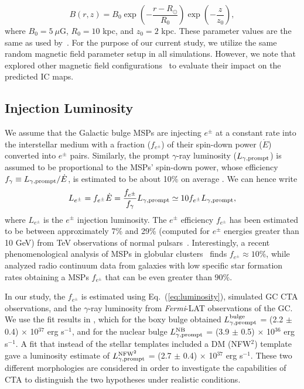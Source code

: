 \documentclass[doublespace,nopageskip]{VTthesis} %
\begin{document}
\begin{equation}\label{eq:Bfield}
	B(r,z) = B_0 \exp{\left(-\dfrac{r-R_\odot}{R_0}\right)}\exp{\left(-\dfrac{z}{z_0}\right)},
\end{equation}
where $B_0 = 5\ \mu$G, $R_0 = 10$ kpc, and $z_0 = 2$ kpc. These parameter values are the same as used by~\citet{Johannesson:2018bit}. For the purpose of our current study, we utilize the same random magnetic field parameter setup in all simulations. However, 
we note that \cite{Song:2019nrx} explored other magnetic field configurations~\citep{Crocker:2010xc} to evaluate their impact on the predicted IC maps. 



\subsection{Injection Luminosity}

We assume that the Galactic bulge MSPs are injecting $e^{\pm}$ at a constant rate into the interstellar medium with a fraction ($f_{e^{\pm}}$) of their spin-down power ($\dot E$) converted into $e^{\pm}$ pairs. Similarly, the prompt $\gamma$-ray luminosity ($L_{\gamma,{\rm prompt}}$) is assumed to be proportional to the MSPs' spin-down power, whose efficiency $f_\gamma \equiv L_{\gamma,{\rm prompt}}/\dot{E}$, is estimated to be about 10\% on average \citep{TheFermi-LAT:2013ssa}. We can hence write 
\begin{equation}\label{eq:luminosity}
  L_{e^\pm}=f_{e^\pm}\dot{E}=\frac{f_{e^\pm}}{f_{\gamma}}  L_{\gamma,{\rm prompt}} \simeq 10f_{e^\pm} L_{\gamma,{\rm prompt}},
\end{equation}
where $L_{e^\pm}$ is the $e^\pm$ injection luminosity. The $e^\pm$ efficiency $f_{e^\pm}$ has been estimated to be between approximately 7\% and 29\% (computed for $e^\pm$ energies greater than 10 GeV) from TeV observations of normal pulsars~\citep{Hooper:2017gtd}.
Interestingly, a recent phenomenological analysis of MSPs in globular clusters~\citep{Song:2021zrs} finds $f_{e^\pm}\approx 10\%$, while \citet{Sudoh:2020hyu} analyzed radio continuum data from galaxies with low specific star formation rates obtaining a MSPs $f_{e^\pm}$ that can be even greater than $90\%$.



In our study, the $f_{e^\pm}$ is estimated using Eq.~(\ref{eq:luminosity}), simulated GC CTA observations, and the $\gamma$-ray luminosity from \textit{Fermi}-LAT observations of the GC. We use the fit results in \cite{Macias:2019omb}, which for the boxy bulge obtained $L^{\text{bulge}}_{\gamma,{\rm prompt}}$ = (2.2 $\pm$ 0.4) $\times$ 10$^{37}$ erg s$^{-1}$, and for the nuclear bulge $L^{\text{NB}}_{\gamma,{\rm prompt}}$ = (3.9 $\pm$ 0.5) $\times$ 10$^{36}$ erg s$^{-1}$. A fit that instead of the stellar templates included a DM (NFW$^2$) template gave a luminosity estimate of $L^{\text{NFW}^2}_{\gamma,{\rm prompt}}$ = (2.7 $\pm$ 0.4) $\times$ 10$^{37}$ erg s$^{-1}$. These two different morphologies are considered in order to investigate the capabilities of CTA to distinguish the two hypotheses under realistic conditions.
\end{document}
